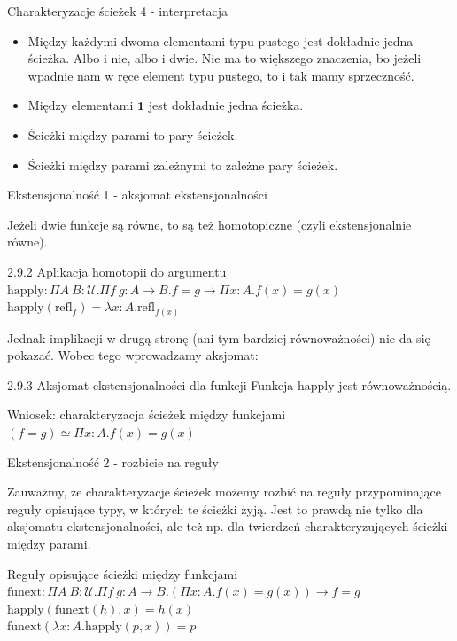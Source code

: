 \documentclass{beamer}
\newcommand{\U}{\mathcal{U}}
\newcommand{\refl}[1]{\text{refl}_{#1}}
\newcommand{\happly}{\text{happly}}
\newcommand{\funext}{\text{funext}}
\begin{document}
\begin{frame}{Charakteryzacje ścieżek 4 - interpretacja}
\begin{itemize}
	\item Między każdymi dwoma elementami typu pustego jest dokładnie jedna ścieżka. Albo i nie, albo i dwie. Nie ma to większego znaczenia, bo jeżeli wpadnie nam w ręce element typu pustego, to i tak mamy sprzeczność.
	\item Między elementami $\textbf{1}$ jest dokładnie jedna ścieżka.
	\item Ścieżki między parami to pary ścieżek.
	\item Ścieżki między parami zależnymi to zależne pary ścieżek.
\end{itemize}
\end{frame}

\begin{frame}{Ekstensjonalność 1 - aksjomat ekstensjonalności}

Jeżeli dwie funkcje są równe, to są też homotopiczne (czyli ekstensjonalnie równe).

\begin{block}{2.9.2 Aplikacja homotopii do argumentu}
$\happly: \Pi A\ B : \U. \Pi f\ g : A \to B. f = g \to \Pi x : A. f(x) = g(x)$ \\
$\happly(\refl{f}) = \lambda x : A. \refl{f(x)}$
\end{block}

Jednak implikacji w drugą stronę (ani tym bardziej równoważności) nie da się pokazać. Wobec tego wprowadzamy aksjomat:

\begin{block}{2.9.3 Aksjomat ekstensjonalności dla funkcji}
Funkcja $\happly$ jest równoważnością.
\end{block}

\begin{block}{Wniosek: charakteryzacja ścieżek między funkcjami}
$(f = g) \simeq \Pi x : A. f(x) = g(x)$
\end{block}

\end{frame}

\begin{frame}{Ekstensjonalność 2 - rozbicie na reguły}

Zauważmy, że charakteryzacje ścieżek możemy rozbić na reguły przypominające reguły opisujące typy, w których te ścieżki żyją. Jest to prawdą nie tylko dla aksjomatu ekstensjonalności, ale też np. dla twierdzeń charakteryzujących ścieżki między parami.

\begin{block}{Reguły opisujące ścieżki między funkcjami}
$\funext : \Pi A\ B : \U. \Pi f\ g : A \to B. (\Pi x : A. f(x) = g(x)) \to f = g$ \\

$\happly(\funext(h), x) = h(x)$ \\

$\funext(\lambda x : A. \happly(p, x)) = p$
\end{block}

\end{frame}
\end{document}
